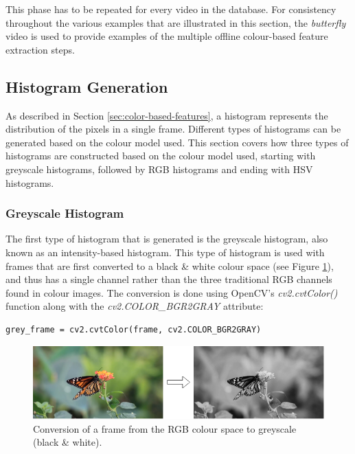 This phase has to be repeated for every video in the database. For consistency throughout the various examples that are illustrated in this section, the \textit{butterfly} video is used to provide examples of the multiple offline colour-based feature extraction steps.


\subsection{Histogram Generation}

As described in Section \ref{sec:color-based-features}, a histogram represents the distribution of the pixels in a single frame. Different types of histograms can be generated based on the colour model used. This section covers how three types of histograms are constructed based on the colour model used, starting with greyscale histograms, followed by RGB histograms and ending with HSV histograms.


\subsubsection{Greyscale Histogram}
\label{sec:implementation-greyscale-histogram}

The first type of histogram that is generated is the greyscale histogram, also known as an intensity-based histogram. This type of histogram is used with frames that are first converted to a black \& white colour space (see Figure \ref{fig:rgb_to_greyscale}), and thus has a single channel rather than the three traditional RGB channels found in colour images. The conversion is done using OpenCV's \textit{cv2.cvtColor()} function along with the \textit{cv2.COLOR\_BGR2GRAY} attribute: 

\begin{lstlisting}
grey_frame = cv2.cvtColor(frame, cv2.COLOR_BGR2GRAY)
\end{lstlisting}

\begin{figure}[h] 
\centerline{\includegraphics[width=\textwidth]{figures/implementation/rgb_to_greyscale.png}}
\caption{\label{fig:rgb_to_greyscale}Conversion of a frame from the RGB colour space to greyscale (black \& white).}
\end{figure}


